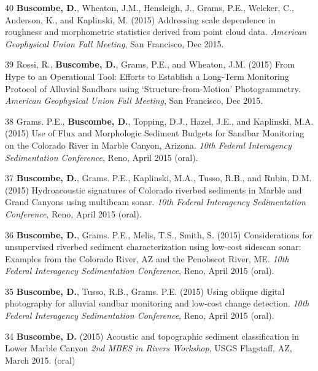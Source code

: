 \documentclass[margin,line]{resume}
\begin{document}
\begin{resume}
\begin{footnotesize}
\begin{list1}
        \item[40] {\bf Buscombe, D.}, Wheaton, J.M., Hensleigh, J., Grams, P.E., Welcker, C., Anderson, K., and Kaplinski, M. (2015) Addressing scale dependence in roughness and morphometric statistics derived from point cloud data. {\sl American Geophysical Union Fall Meeting}, San Francisco, Dec 2015.\\    
        
        \item[39] Rossi, R., {\bf Buscombe, D.}, Grams, P.E., and Wheaton, J.M. (2015) From Hype to an Operational Tool: Efforts to Establish a Long-Term Monitoring Protocol of Alluvial Sandbars using `Structure-from-Motion' Photogrammetry. {\sl American Geophysical Union Fall Meeting}, San Francisco, Dec 2015.\\        

        \item[38] Grams. P.E., {\bf Buscombe, D.}, Topping, D.J., Hazel, J.E., and Kaplinski, M.A. (2015) Use of Flux and Morphologic Sediment Budgets for Sandbar Monitoring on the Colorado River in Marble Canyon, Arizona. {\sl 10th Federal Interagency Sedimentation Conference}, Reno, April 2015 (oral).\\

        \item[37] {\bf Buscombe, D.}, Grams. P.E., Kaplinski, M.A., Tusso, R.B., and Rubin, D.M. (2015) Hydroacoustic signatures of Colorado riverbed sediments in Marble and Grand Canyons using multibeam sonar. {\sl 10th Federal Interagency Sedimentation Conference}, Reno, April 2015 (oral).\\

        \item[36] {\bf Buscombe, D.}, Grams. P.E., Melis, T.S., Smith, S. (2015) Considerations for unsupervised riverbed sediment characterization using low-cost sidescan sonar: Examples from the Colorado River, AZ and the Penobscot River, ME. {\sl 10th Federal Interagency Sedimentation Conference}, Reno, April 2015 (oral).\\

        \item[35] {\bf Buscombe, D.}, Tusso, R.B., Grams. P.E. (2015) Using oblique digital photography for alluvial sandbar monitoring and low-cost change detection. {\sl 10th Federal Interagency Sedimentation Conference}, Reno, April 2015 (oral).\\

        \item[34] {\bf Buscombe, D.} (2015) Acoustic and topographic sediment classification in Lower Marble Canyon {\sl 2nd MBES in Rivers Workshop}, USGS Flagstaff, AZ, March 2015. (oral)\\
        

\end{list1}
\end{footnotesize}
\end{resume}
\end{document}

